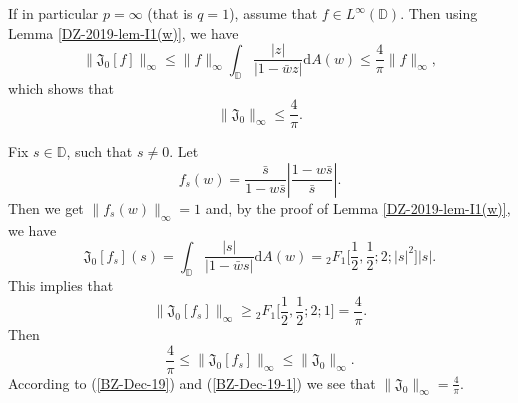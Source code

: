 \documentclass[a4paper,12pt]{amsart}
\theoremstyle{definition}
\numberwithin{equation}{section}
\newcommand{\ID}{{\mathbb D}}
\def\be{\begin{equation}}
\def\ee{\end{equation}}
\begin{document}
If in particular $p=\infty$ (that is $q=1$), assume that $f\in L^\infty(\ID)$. Then using Lemma \ref{DZ-2019-lem-I1(w)}, we have
$$\|\mathfrak{J}_0[f]\|_\infty\leq\|f\|_\infty\int_{\ID}\frac{|z|}{|1-\bar{w}z|}\mathrm{d}A(w) \leq\frac{4}{\pi}\|f\|_\infty,$$
which shows that
\be\label{BZ-Dec-19}\|\mathfrak{J}_0\|_\infty\leq \frac{4}{\pi}.\ee

Fix $s\in\ID$, such that $s\neq0$. Let
$$f_s(w)=\frac{\bar{s}}{1-w\bar{s}}\left|\frac{1-w\bar{s}}{\bar{s}}\right|.$$
Then we get $\|f_s(w)\|_\infty=1$ and, by the proof of Lemma \ref{DZ-2019-lem-I1(w)}, we have
$$\mathfrak{J}_0[f_s](s)=\int_{\ID}\frac{|s|}{|1-\bar{w}s|}\mathrm{d}A(w) ={}_2F_1\bigg[\frac{1}{2}, \frac{1}{2}; 2; |s|^2\bigg]|s|.$$
This implies that
$$\|\mathfrak{J}_0[f_s]\|_\infty\geq{}_2F_1\bigg[\frac{1}{2}, \frac{1}{2}; 2; 1\bigg]=\frac{4}{\pi}.$$
Then
\be\label{BZ-Dec-19-1}\frac{4}{\pi}\leq\|\mathfrak{J}_0[f_s]\|_\infty\leq\|\mathfrak{J}_0\|_\infty.\ee
According to (\ref{BZ-Dec-19}) and (\ref{BZ-Dec-19-1}) we see that $\|\mathfrak{J}_0\|_\infty=\frac{4}{\pi}$.
\end{document}

